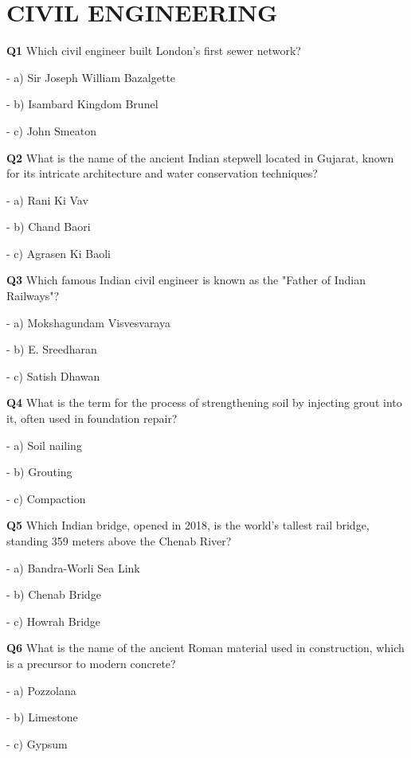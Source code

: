 \section{CIVIL ENGINEERING}

\textbf{Q1} Which civil engineer built London's first sewer network?\par
\quad - a) Sir Joseph William Bazalgette\par
\quad - b) Isambard Kingdom Brunel\par
\quad - c) John Smeaton\par

\textbf{Q2} What is the name of the ancient Indian stepwell located in Gujarat, known for its intricate architecture and water conservation techniques?\par
\quad - a) Rani Ki Vav\par
\quad - b) Chand Baori\par
\quad - c) Agrasen Ki Baoli\par

\textbf{Q3} Which famous Indian civil engineer is known as the "Father of Indian Railways"?\par
\quad - a) Mokshagundam Visvesvaraya\par
\quad - b) E. Sreedharan\par
\quad - c) Satish Dhawan\par

\textbf{Q4} What is the term for the process of strengthening soil by injecting grout into it, often used in foundation repair?\par
\quad - a) Soil nailing\par
\quad - b) Grouting\par
\quad - c) Compaction\par

\textbf{Q5} Which Indian bridge, opened in 2018, is the world's tallest rail bridge, standing 359 meters above the Chenab River?\par
\quad - a) Bandra-Worli Sea Link\par
\quad - b) Chenab Bridge\par
\quad - c) Howrah Bridge\par

\textbf{Q6} What is the name of the ancient Roman material used in construction, which is a precursor to modern concrete?\par
\quad - a) Pozzolana\par
\quad - b) Limestone\par
\quad - c) Gypsum\par

